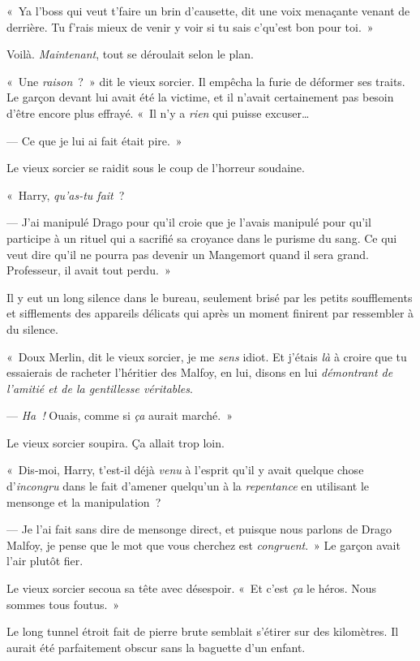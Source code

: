 «~Ya l'boss qui veut t'faire un brin d'causette, dit une voix menaçante venant de derrière.
Tu f'rais mieux de venir y voir si tu sais c'qu'est bon pour toi.~»

Voilà. \emph{Maintenant}, tout se déroulait selon le plan.


«~Une \emph{raison}~?~»
dit le vieux sorcier.
Il empêcha la furie de déformer ses traits.
Le garçon devant lui avait été la victime, et il n'avait certainement pas besoin d'être encore plus effrayé.
«~Il n'y a \emph{rien} qui puisse excuser…

--- Ce que je lui ai fait était pire.~»

Le vieux sorcier se raidit sous le coup de l'horreur soudaine.

«~Harry, \emph{qu'as-tu fait}~?

--- J'ai manipulé Drago pour qu'il croie que je l'avais manipulé pour qu'il participe à un rituel qui a sacrifié sa croyance dans le purisme du sang.
Ce qui veut dire qu'il ne pourra pas devenir un Mangemort quand il sera grand.
Professeur, il avait tout perdu.~»

Il y eut un long silence dans le bureau, seulement brisé par les petits soufflements et sifflements des appareils délicats qui après un moment finirent par ressembler à du silence.

«~Doux Merlin, dit le vieux sorcier, je me \emph{sens} idiot.
Et j'étais \emph{là} à croire que tu essaierais de racheter l'héritier des Malfoy, en lui, disons en lui \emph{démontrant de l'amitié et de la gentillesse véritables}.

--- \emph{Ha~!} Ouais, comme si \emph{ça} aurait marché.~»

Le vieux sorcier soupira.
Ça allait trop loin.

«~Dis-moi, Harry, t'est-il déjà \emph{venu} à l'esprit qu'il y avait quelque chose d'\emph{incongru} dans le fait d'amener quelqu'un à la \emph{repentance} en utilisant le mensonge et la manipulation~?

--- Je l'ai fait sans dire de mensonge direct, et puisque nous parlons de Drago Malfoy, je pense que le mot que vous cherchez est \emph{congruent}.~»
Le garçon avait l'air plutôt fier.

Le vieux sorcier secoua sa tête avec désespoir.
«~Et c'est \emph{ça} le héros.
Nous sommes tous foutus.~»


Le long tunnel étroit fait de pierre brute semblait s'étirer sur des kilomètres.
Il aurait été parfaitement obscur sans la baguette d'un enfant.

